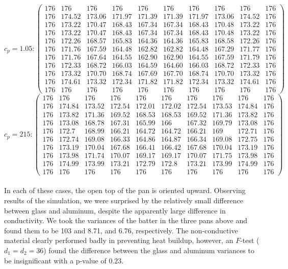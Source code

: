 \documentclass[12pt]{reedmcm}
\begin{document}
\[c_p = 1.05: \begin{pmatrix} 176&176&176&176&176&176&176&176&176&176\\
176&174.52&173.06&171.97&171.39&171.39&171.97&173.06&174.52&176\\
176&173.22&170.47&168.43&167.34&167.34&168.43&170.48&173.22&176\\
176&173.22&170.47&168.43&167.34&167.34&168.43&170.48&173.22&176\\
176&172.26&168.57&165.83&164.36&164.36&165.83&168.58&172.26&176\\
176&171.76&167.59&164.48&162.82&162.82&164.48&167.29&171.77&176\\
176&171.76&167.64&164.55&162.90&162.90&164.55&167.59&171.79&176\\
176&172.33&168.72&166.03&164.59&164.60&166.03&168.72&172.33&176\\
176&173.32&170.70&168.74&167.69&167.70&168.74&170.70&173.32&176\\
176&174.61&173.32&172.34&171.82&171.82&172.34&173.32&174.61&176\\
176&176&176&176&176&176&176&176&176&176\end{pmatrix}\]
\[c_p = 215: \begin{pmatrix} 176&176&176&176&176&176&176&176&176&176\\
176&174.84&173.52&172.54&172.01&172.02&172.54&173.53&174.84&176\\
176&173.82&171.36&169.52&168.53&168.53&169.52&171.36&173.82&176\\
176&173.08&168.78&167.31&165.99&166&167.32&169.79&173.08&176\\
176&172.7&168.99&166.21&164.72&164.72&166.21&169&172.71&176\\
176&172.74&169.08&166.33&164.86&164.87&166.34&169.08&172.75&176\\
176&173.19&170.04&167.68&166.41&166.42&167.68&170.04&173.19&176\\
176&173.98&171.74&170.07&169.17&169.17&170.07&171.75&173.98&176\\
176&174.99&173.99&173.21&172.79&172.8&173.21&173.99&174.99&176\\
176&176&176&176&176&176&176&176&176&176 \end{pmatrix}\]
\\
In each of these cases, the open top of the pan is oriented upward.  Observing results of the simulation, we were surprised by the relatively small difference between glass and aluminum, despite the apparently large difference in conductivity.  We took the variances of the batter in the three pans above and found them to be 103 and 8.71, and 6.76, respectively.  The non-conductive material clearly performed badly in preventing heat buildup, however, an $F$-test ($d_1 = d_2 = 36$) found the difference between the glass and aluminum variances to be insignificant with a p-value of $0.23$.
\end{document}
